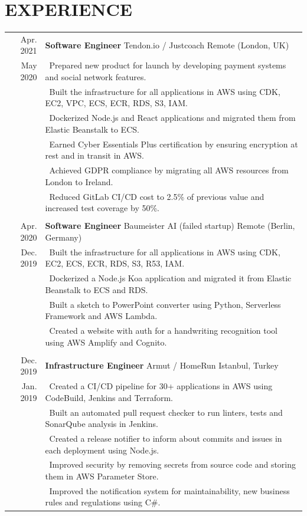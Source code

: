 \documentclass[a4paper, 10pt]{article}
\begin{document}
\section{EXPERIENCE}
\begin{tabular}{r p{15.7cm}}
	Apr. 2021 & \textbf{Software Engineer} \hspace{1em} Tendon.io / Justcoach \hfill Remote (London, UK)\\
	May 2020 & \textbullet\ Prepared new product for launch by developing payment systems and social network features.\\
	& \textbullet\ Built the infrastructure for all applications in AWS using CDK, EC2, VPC, ECS, ECR, RDS, S3, IAM.\\
	& \textbullet\ Dockerized Node.js and React applications and migrated them from Elastic Beanstalk to ECS.\\
	& \textbullet\ Earned Cyber Essentials Plus certification by ensuring encryption at rest and in transit in AWS.\\
	& \textbullet\ Achieved GDPR compliance by migrating all AWS resources from London to Ireland.\\
	& \textbullet\ Reduced GitLab CI/CD cost to 2.5\% of previous value and increased test coverage by 50\%.\\\\
	Apr. 2020 & \textbf{Software Engineer} \hspace{1em} Baumeister AI (failed startup) \hfill Remote (Berlin, Germany)\\
	Dec. 2019 & \textbullet\ Built the infrastructure for all applications in AWS using CDK, EC2, ECS, ECR, RDS, S3, R53, IAM.\\
	& \textbullet\ Dockerized a Node.js Koa application and migrated it from Elastic Beanstalk to ECS and RDS.\\
	& \textbullet\ Built a sketch to PowerPoint converter using Python, Serverless Framework and AWS Lambda.\\
	& \textbullet\ Created a website with auth for a handwriting recognition tool using AWS Amplify and Cognito.\\\\
	Dec. 2019 & \textbf{Infrastructure Engineer} \hspace{1em} Armut / HomeRun \hfill Istanbul, Turkey\\
	Jan. 2019 & \textbullet\ Created a CI/CD pipeline for 30+ applications in AWS using CodeBuild, Jenkins and Terraform.\\
	& \textbullet\ Built an automated pull request checker to run linters, tests and SonarQube analysis in Jenkins.\\
	& \textbullet\ Created a release notifier to inform about commits and issues in each deployment using Node.js.\\
	& \textbullet\ Improved security by removing secrets from source code and storing them in AWS Parameter Store.\\
	& \textbullet\ Improved the notification system for maintainability, new business rules and regulations using C\#.
\end{tabular}
\end{document}
